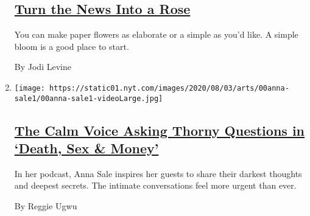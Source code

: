 \begin{enumerate}
  \hypertarget{turn-the-news-into-a-rose}{%
  \subsection{\texorpdfstring{\href{/2020/08/01/at-home/coronavirus-paper-flowers.html}{Turn
  the News Into a
  Rose}}{Turn the News Into a Rose}}\label{turn-the-news-into-a-rose}}

  You can make paper flowers as elaborate or a simple as you'd like. A
  simple bloom is a good place to start.

  By Jodi Levine
\item
  \texttt{[image: https://static01.nyt.com/images/2020/08/03/arts/00anna-sale1/00anna-sale1-videoLarge.jpg]}

  \hypertarget{the-calm-voice-asking-thorny-questions-in-death-sex--money}{%
  \subsection{\texorpdfstring{\href{/2020/08/02/arts/anna-sale-death-sex-money-podcast.html}{The
  Calm Voice Asking Thorny Questions in `Death, Sex \&
  Money'}}{The Calm Voice Asking Thorny Questions in `Death, Sex \& Money'}}\label{the-calm-voice-asking-thorny-questions-in-death-sex--money}}

  In her podcast, Anna Sale inspires her guests to share their darkest
  thoughts and deepest secrets. The intimate conversations feel more
  urgent than ever.

  By Reggie Ugwu
\end{enumerate}


